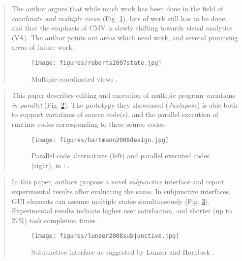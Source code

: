 

		\begin{quote}
		\small
		The author argues that while much work has been done in the 
		field of {\em coordinate and multiple views} (Fig. \ref{fig:roberts2007state}),
		lots of work still has to be done, and 
		that the emphasis of CMV is slowly shifting towards visual analytics (VA).
		The author points out areas which need work, and several promising areas of future work.
		\begin{figure}[htb]
		\begin{center}
		\texttt{[image: figures/roberts2007state.jpg]}
		\caption{Multiple coordinated views \cite{roberts2007state}.}
		\label{fig:roberts2007state}
		\end{center}
		\end{figure}
		\end{quote}

		\begin{quote}
		\small
		This paper describes editing and execution of multiple program variations 
		{\em in parallel} (Fig. \ref{fig:hartmann2008design}).
		The prototype they showcased ({\em Juxtapose}) is able both to support variations of source code(s),
		and the parallel execution of runtime codes corresponding to these source codes.
		\begin{figure}[htb]
		\begin{center}
		\texttt{[image: figures/hartmann2008design.jpg]}
		\caption{Parallel code alternatives (left) and 
		parallel executed codes (right), 
		in \citeauthor{hartmann2008design}: 
		\cite{hartmann2008design}.}
		\label{fig:hartmann2008design}
		\end{center}
		\end{figure}
		\end{quote}



		\begin{quote}
		\small
		In this paper, authors propose a novel {\em subjunctive} interface 
		and report experimental results after evaluating the same.
		In subjunctive interfaces, GUI elements can assume multiple states simultaneously 
		(Fig. \ref{fig:lunzer2008subjunctive}).
		Experimental results indicate higher user satisfaction,
		and shorter (up to 27\%) task completion times.
		\begin{figure}[htb]
		\begin{center}
		\texttt{[image: figures/lunzer2008subjunctive.jpg]}
		\caption{Subjunctive interface as suggested by Lunzer and Hornb{\ae}k \cite{lunzer2008subjunctive}.}
		\label{fig:lunzer2008subjunctive}
		\end{center}
		\end{figure}
		\end{quote}

